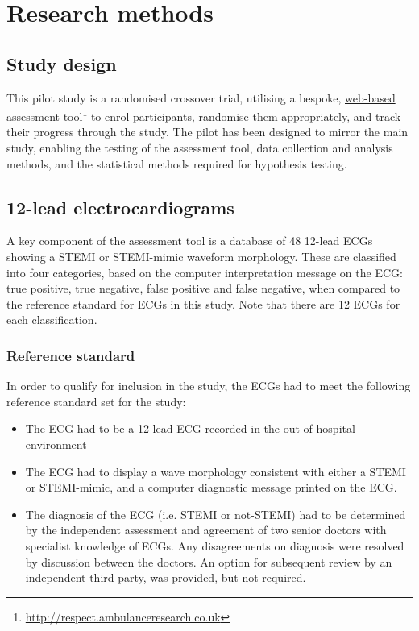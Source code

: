\chapter{Research methods}
\label{researchmethods}


\section{Study design}
\label{studydesign}

This pilot study is a randomised crossover trial, utilising a bespoke, \href{http://respect.ambulanceresearch.co.uk}{web-based assessment tool}\footnote{\href{http://respect.ambulanceresearch.co.uk}{http:/\slash respect.ambulanceresearch.co.uk}} to enrol participants, randomise them appropriately, and track their progress through the study. The pilot has been designed to mirror the main study, enabling the testing of the assessment tool, data collection and analysis methods, and the statistical methods required for hypothesis testing.

\section{12-lead electrocardiograms}
\label{leadelectrocardiograms}

A key component of the assessment tool is a database of 48 12-lead ECGs showing a STEMI or STEMI-mimic waveform morphology. These are classified into four categories, based on the computer interpretation message on the ECG: true positive, true negative, false positive and false negative, when compared to the reference standard for ECGs in this study. Note that there are 12 ECGs for each classification.

\subsection{Reference standard}
\label{referencestandard}

In order to qualify for inclusion in the study, the ECGs had to meet the following reference standard set for the study:

\begin{itemize}
\item The ECG had to be a 12-lead ECG recorded in the out-of-hospital environment

\item The ECG had to display a wave morphology consistent with either a STEMI or STEMI-mimic, and a computer diagnostic message printed on the ECG.

\item The diagnosis of the ECG (i.e. STEMI or not-STEMI) had to be determined by the independent assessment and agreement of two senior doctors with specialist knowledge of ECGs. Any disagreements on diagnosis were resolved by discussion between the doctors. An option for subsequent review by an independent third party, was provided, but not required.

\end{itemize}

